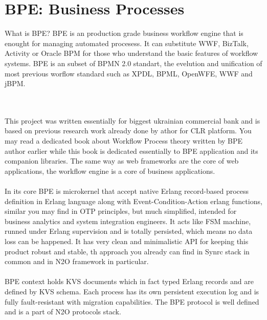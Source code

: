 \section{BPE: Business Processes}

What is BPE? BPE is an production grade business workflow engine that
is enought for managing automated procesess.
It can substitute WWF, BizTalk, Activity or Oracle BPM for those who
understand the basic features of workflow systems.
BPE is an subset of BPMN 2.0 standart, the evelution and unification
of most previous worflow standard such as XPDL, BPML, OpenWFE, WWF and jBPM.

\

\paragraph{}
This project was written essentially for biggest ukrainian commercial
bank and is based on previous research work already done by athor
for CLR platform. You may read a dedicated book about Workflow Process
theory written by BPE author earlier while this book is dedicated
essentially to BPE application and its companion libraries.
The same way as web frameworks are the core of web applications,
the workflow engine is a core of business applications.

\paragraph{}
In its core BPE is microkernel that accept native Erlang record-based
process definition in Erlang language along with Event-Condition-Action
erlang functions, similar you may find in OTP principles, but much simplified,
intended for business analytics and system integration engineers. It acts
like FSM machine, runned under Erlang supervision and is totally persisted,
which means no data loss can be happened. It has very clean and minimalistic
API for keeping this product robust and stable, th approach you already
can find in Synrc stack in common and in N2O framework in particular.

\paragraph{}
BPE context holds KVS documents which in fact typed Erlang
records and are defined by KVS schema. Each process has its own persistent
execution log and is fully fault-resistant with migration capabilities.
The BPE protocol is well defined and is a part of N2O protocols stack.

